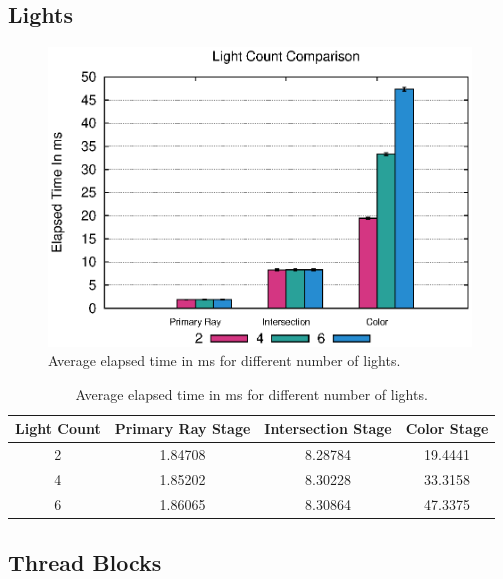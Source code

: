 \documentclass{article}
\begin{document}
\subsection{Lights}

\begin{figure}[h!tbp]
    \centering
    \includegraphics[width=1.0\columnwidth]{Figures/lightcount.eps}
    \caption{Average elapsed time in ms for different number of lights. \label{fig:lightCount}}
\end{figure}

\begin{table}[h!btp]
\centering
\def\arraystretch{1.5}
\begin{tabular}{c|c|c|c}
Light Count & Primary Ray Stage & Intersection Stage & Color Stage \\ [2pt]
\hline
2 & 1.84708 & 8.28784 & 19.4441 \\
\hline
4 & 1.85202 & 8.30228 & 33.3158 \\
\hline
6 & 1.86065 & 8.30864 & 47.3375 \\
\hline
\end{tabular}
\caption{Average elapsed time in ms for different number of lights. \label{tab:ResultsNumberOfLights}}
\end{table}


\subsection{Thread Blocks}
\end{document}
